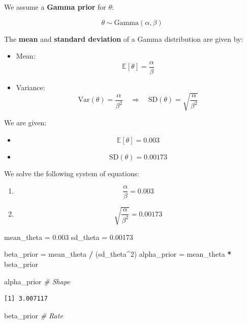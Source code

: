 \documentclass[
]{article}
\newenvironment{Shaded}{\begin{snugshade}}{\end{snugshade}}
\newcommand{\CommentTok}[1]{\textcolor[rgb]{0.56,0.35,0.01}{\textit{#1}}}
\newcommand{\DecValTok}[1]{\textcolor[rgb]{0.00,0.00,0.81}{#1}}
\newcommand{\FloatTok}[1]{\textcolor[rgb]{0.00,0.00,0.81}{#1}}
\newcommand{\NormalTok}[1]{#1}
\newcommand{\OtherTok}[1]{\textcolor[rgb]{0.56,0.35,0.01}{#1}}
\newcommand{\SpecialCharTok}[1]{\textcolor[rgb]{0.81,0.36,0.00}{\textbf{#1}}}
\begin{document}
We assume a \textbf{Gamma prior} for \(\theta\):

\[
\theta \sim \text{Gamma}(\alpha, \beta)
\]

The \textbf{mean} and \textbf{standard deviation} of a Gamma
distribution are given by:

\begin{itemize}
\item
  Mean:\\
  \[
  \mathbb{E}[\theta] = \frac{\alpha}{\beta}
  \]
\item
  Variance:\\
  \[
  \text{Var}(\theta) = \frac{\alpha}{\beta^2}
  \quad \Rightarrow \quad
  \text{SD}(\theta) = \sqrt{\frac{\alpha}{\beta^2}}
  \]
\end{itemize}

We are given:

\begin{itemize}
\item
  \[\mathbb{E}[\theta] = 0.003\]
\item
  \[\text{SD}(\theta) = 0.00173\]
\end{itemize}

We solve the following system of equations:

\begin{enumerate}
\def\labelenumi{\arabic{enumi}.}
\item
  \[\frac{\alpha}{\beta} = 0.003\]
\item
  \[\sqrt{\frac{\alpha}{\beta^2}} = 0.00173\]
\end{enumerate}

\begin{Shaded}
\begin{Highlighting}[]
\NormalTok{mean\_theta }\OtherTok{=} \FloatTok{0.003}
\NormalTok{sd\_theta }\OtherTok{=} \FloatTok{0.00173}

\NormalTok{beta\_prior }\OtherTok{=}\NormalTok{ mean\_theta }\SpecialCharTok{/}\NormalTok{ (sd\_theta}\SpecialCharTok{\^{}}\DecValTok{2}\NormalTok{)}
\NormalTok{alpha\_prior }\OtherTok{=}\NormalTok{ mean\_theta }\SpecialCharTok{*}\NormalTok{ beta\_prior}

\NormalTok{alpha\_prior }\CommentTok{\# Shape}
\end{Highlighting}
\end{Shaded}

\begin{verbatim}
[1] 3.007117
\end{verbatim}

\begin{Shaded}
\begin{Highlighting}[]
\NormalTok{beta\_prior }\CommentTok{\# Rate}
\end{Highlighting}
\end{Shaded}
\end{document}

